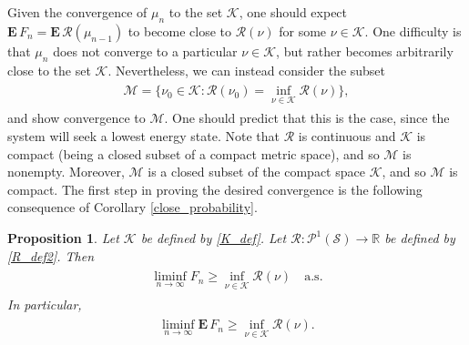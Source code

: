 \documentclass[11pt,reqno]{amsart}
\numberwithin{equation}{section}
\newtheorem{prop}[thm]{Proposition}
\theoremstyle{definition}
\begin{document}
Given the convergence of $\mu_{n}$ to the set ${\mathcal{K}}$, one should expect ${\mathbf{E}}\, F_n = {\mathbf{E}}\,{\mathcal{R}}(\mu_{n-1})$ to become close to ${\mathcal{R}}(\nu)$ for some $\nu \in {\mathcal{K}}$.
One difficulty is that $\mu_{n}$ does not converge to a particular $\nu \in {\mathcal{K}}$, but rather becomes arbitrarily close to the set ${\mathcal{K}}$. 
Nevertheless, we can instead consider the subset
{\begin{align} \begin{split} {
{\mathcal{M}} = \Big\{\nu_0 \in {\mathcal{K}} : {\mathcal{R}}(\nu_0) = \inf_{\nu \in {\mathcal{K}}} {\mathcal{R}}(\nu)\Big\}, \label{M_def}
} \end{split} \end{align}}
and show convergence to ${\mathcal{M}}$.
One should predict that this is the case, since the system will seek a lowest energy state.
Note that ${\mathcal{R}}$ is continuous and ${\mathcal{K}}$ is compact (being a closed subset of a compact metric space), and so ${\mathcal{M}}$ is nonempty.
Moreover, ${\mathcal{M}}$ is a closed subset of the compact space ${\mathcal{K}}$, and so ${\mathcal{M}}$ is compact.
The first step in proving the desired convergence is the following consequence of Corollary \ref{close_probability}.

\begin{prop} \label{lower_bound}
Let ${\mathcal{K}}$ be defined by \eqref{K_def}.
Let ${\mathcal{R}} : {\mathcal{P}}^1({\mathcal{S}}) \to {\mathbb{R}}$ be defined by \eqref{R_def2}.
Then
{\begin{align} \begin{split} {
\liminf_{n \to \infty} F_n \geq \inf_{\nu \in {\mathcal{K}}} {\mathcal{R}}(\nu) \quad \mathrm{a.s.} \label{lower_bound_as}
} \end{split} \end{align}}
In particular,
{\begin{align} \begin{split} {
\liminf_{n \to \infty} {\mathbf{E}}\, F_n \geq \inf_{\nu \in {\mathcal{K}}} {\mathcal{R}}(\nu). \label{lower_bound_eq}
} \end{split} \end{align}}
\end{prop}
\end{document}
